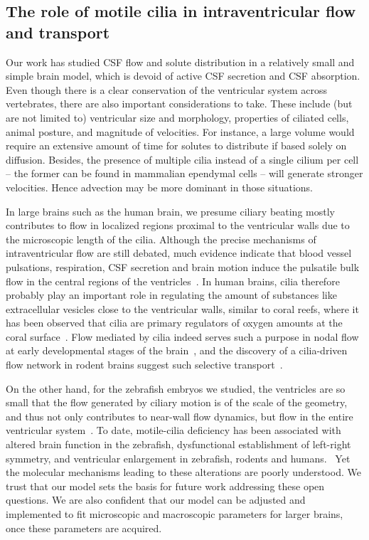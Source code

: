 \documentclass{WileyMSP-template}
\begin{document}
\subsection{The role of motile cilia in intraventricular flow and transport}
Our work has studied CSF flow and solute distribution
in a relatively small and simple brain model, which is devoid of
active CSF secretion and CSF absorption. Even though there is
a clear conservation of the ventricular system across vertebrates,
there are also important considerations to take. These include (but are not limited to)
ventricular size and morphology, properties of ciliated cells,
animal posture, and magnitude of velocities. For instance, a large
volume would require an extensive amount of time for solutes to distribute
if based solely on diffusion. Besides, the presence of multiple cilia
instead of a single cilium per cell -- the former can be found in
mammalian ependymal cells -- will generate stronger velocities.
Hence advection may be more dominant in those situations.

In large brains such as the human brain, we presume ciliary beating mostly 
contributes to flow in localized regions proximal to the ventricular walls due to
the microscopic length of the cilia.
Although the precise mechanisms of intraventricular flow are still debated,
much evidence indicate that blood vessel pulsations, respiration, CSF secretion
and brain motion induce the pulsatile bulk flow in the central
regions of the ventricles~\cite{Vinje2019RespiratoryMeasurements,
Siyahhan2014FlowVentricles, Linninger2005PulsatileBrain, Enzmann1992BrainImaging,
Kurtcuoglu2007ComputationalSylvius}.
In human brains, cilia therefore probably play an important role in regulating the
amount of substances like extracellular vesicles close to the ventricular walls, similar to coral
reefs, where it has been observed that cilia are primary regulators of
oxygen amounts at the coral surface~\cite{Pacherres2022CiliaryProduction}.
Flow mediated by cilia indeed serves such a purpose in nodal flow at early
developmental stages of the brain~\cite{Hirokawa2006NodalAsymmetry}, and the discovery
of a cilia-driven flow network in rodent brains suggest such selective
transport~\cite{Faubel2016Cilia-basedVentricles}.

On the other hand, for the zebrafish embryos we studied,
the ventricles are so small that the flow
generated by ciliary motion is of the scale of the geometry, and thus not
only contributes to near-wall flow dynamics, but flow in the entire ventricular
system~\cite{Olstad2019CiliaryDevelopment}.
To date, motile-cilia deficiency has been associated with altered brain function
in the zebrafish, dysfunctional establishment of left-right symmetry,
and ventricular enlargement in zebrafish, rodents and humans.~\cite{Afzelius2004CiliaRelatedDiseases,
Youn2018PrimaryDiseases, Ma2024CiliaDisease, Ibanez-Tallon2002LossHydrocephalus}
Yet the molecular mechanisms leading to these alterations are poorly understood.
We trust that our model sets the basis for future work addressing these open questions.
We are also confident that our model can be adjusted and implemented to fit
microscopic and macroscopic parameters for larger brains, once these parameters are acquired.
\end{document}

